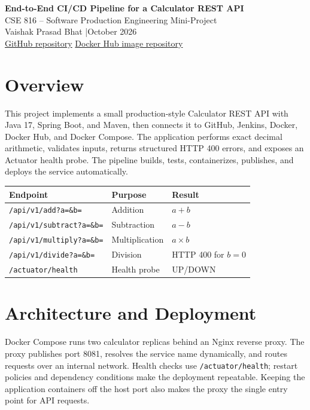 \documentclass[9pt,a4paper]{article}
\begin{document}
\begin{center}
{\LARGE\bfseries End-to-End CI/CD Pipeline for a Calculator REST API}\\[-1pt]
{\normalsize CSE 816 -- Software Production Engineering Mini-Project}\\
{\small Vaishak Prasad Bhat \quad|\quad October 2026}\\[2pt]
{\small
\href{https://github.com/vaishak-iiitb/calc_spe}{GitHub repository}
\quad\textbar\quad
\href{https://hub.docker.com/repository/docker/vaishak2005/calculator-api/general}
{Docker Hub image repository}}
\end{center}

\section{Overview}
This project implements a small production-style Calculator REST API with
Java 17, Spring Boot, and Maven, then connects it to GitHub, Jenkins, Docker,
Docker Hub, and Docker Compose. The application performs exact decimal
arithmetic, validates inputs, returns structured HTTP 400 errors, and exposes
an Actuator health probe. The pipeline builds, tests, containerizes, publishes,
and deploys the service automatically. 

\begin{center}
\small
\begin{tabular}{lll}
\toprule
\textbf{Endpoint} & \textbf{Purpose} & \textbf{Result}\\
\midrule
\texttt{/api/v1/add?a=\&b=} & Addition & \(a+b\)\\
\texttt{/api/v1/subtract?a=\&b=} & Subtraction & \(a-b\)\\
\texttt{/api/v1/multiply?a=\&b=} & Multiplication & \(a\times b\)\\
\texttt{/api/v1/divide?a=\&b=} & Division & HTTP 400 for \(b=0\)\\
\texttt{/actuator/health} & Health probe & UP/DOWN\\
\bottomrule
\end{tabular}
\end{center}

\section{Architecture and Deployment}
Docker Compose runs two calculator replicas behind an Nginx reverse proxy.
The proxy publishes port 8081, resolves the service name dynamically, and
routes requests over an internal network. Health checks use
\texttt{/actuator/health}; restart policies and dependency conditions make
the deployment repeatable. Keeping the application containers off the host
port also makes the proxy the single entry point for API requests.
\end{document}
